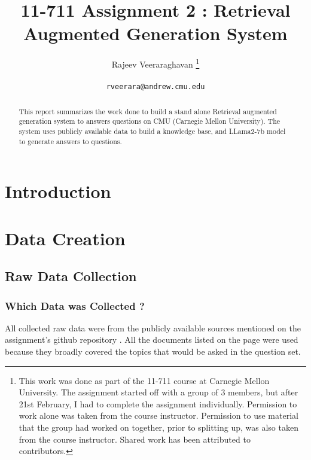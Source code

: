 \documentclass[11pt]{article}
\title{11-711 Assignment 2 : Retrieval Augmented Generation System}
\author{Rajeev Veeraraghavan \thanks{This work was done as part of the 11-711 course at Carnegie Mellon University.
The assignment started off with a group of 3 members, but after 21st February, I had to complete the assignment individually.
Permission to work alone was taken from the course instructor. Permission to use material that the group had worked on together, prior to splitting up, was also taken from the course instructor. Shared work has been attributed to contributors.} \\
\\
  \texttt{rveerara@andrew.cmu.edu}
}
\begin{document}
\maketitle
\begin{abstract}
This report summarizes the work done to build a stand alone Retrieval augmented generation system to answers questions on CMU (Carnegie Mellon University).
The system uses publicly available data to build a knowledge base, and LLama2-7b model to generate answers to questions.
\end{abstract}

\section{Introduction}

\section{Data Creation}

\subsection{Raw Data Collection}
\subsubsection[short]{Which Data was Collected ?}
All collected raw data were from the publicly available sources mentioned on the assignment's github repository \cite{assignment-github}.
All the documents listed on the page were used because they broadly covered the topics that would be asked in the question set.
\end{document}
